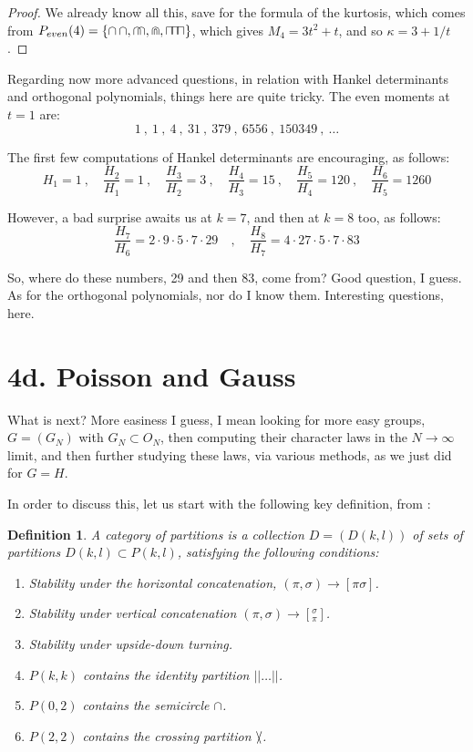 \documentclass[12pt]{amsbook}
\newtheorem{definition}[theorem]{Definition}
\begin{document}
\begin{proof}
We already know all this, save for the formula of the kurtosis, which comes from $P_{even}(4)=\{\cap\,\cap,\cap\!\!\cap,\Cap,\sqcap\hskip-1.6mm\sqcap\hskip-1.6mm\sqcap\}$, which gives $M_4=3t^2+t$, and so $\kappa=3+1/t$.
\end{proof}

Regarding now more advanced questions, in relation with Hankel determinants and orthogonal polynomials, things here are quite tricky. The even moments at $t=1$ are:
$$1\ ,\ 1\ , \ 4\ ,\ 31\ ,\ 379\ ,\ 6556\ ,\ 150349\ ,\ \ldots$$

The first few computations of Hankel determinants are encouraging, as follows:
$$H_1=1\ ,\quad\frac{H_2}{H_1}=1\ ,\quad\frac{H_3}{H_2}=3\ ,\quad\frac{H_4}{H_3}=15\ ,\quad\frac{H_5}{H_4}=120\ ,\quad\frac{H_6}{H_5}=1260$$

However, a bad surprise awaits us at $k=7$, and then at $k=8$ too, as follows:
$$\frac{H_7}{H_6}=2\cdot 9\cdot5\cdot7\cdot29\quad,\quad 
\frac{H_8}{H_7}=4\cdot 27\cdot5\cdot7\cdot83$$

So, where do these numbers, 29 and then 83, come from? Good question, I guess. As for the orthogonal polynomials, nor do I know them. Interesting questions, here.

\section*{4d. Poisson and Gauss}

What is next? More easiness I guess, I mean looking for more easy groups, $G=(G_N)$ with  $G_N\subset O_N$, then computing their character laws in the $N\to\infty$ limit, and then further studying these laws, via various methods, as we just did for $G=H$.

\bigskip

In order to discuss this, let us start with the following key definition, from \cite{bsp}:


\begin{definition}
A category of partitions is a collection $D=(D(k,l))$ of sets of partitions $D(k,l)\subset P(k,l)$, satisfying the following conditions:
\begin{enumerate}
\item Stability under the horizontal concatenation, $(\pi,\sigma)\to[\pi\sigma]$.

\item Stability under vertical concatenation $(\pi,\sigma)\to[^\sigma_\pi]$.

\item Stability under upside-down turning.

\item $P(k,k)$ contains the identity partition $||\ldots||$.

\item $P(0,2)$ contains the semicircle $\cap$.

\item $P(2,2)$ contains the crossing partition $\slash\hskip-2.0mm\backslash$.
\end{enumerate}
\end{definition}
\end{document}
